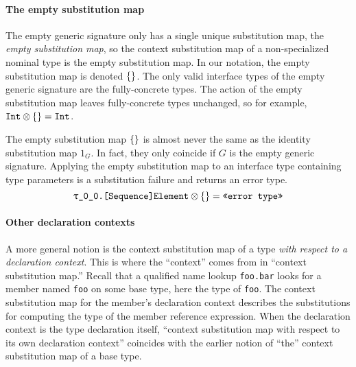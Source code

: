 \documentclass[../generics]{subfiles}
\begin{document}
\paragraph{The empty substitution map}
The empty generic signature only has a single unique substitution map, the \emph{empty substitution map}, so the context substitution map of a non-specialized nominal type is the empty substitution map. In our notation, the empty substitution map is denoted $\{\}$. The only valid interface types of the empty generic signature are the fully-concrete types. The action of the empty substitution map leaves fully-concrete types unchanged, so for example, $\texttt{Int}\otimes\{\} = \texttt{Int}$.

The empty substitution map $\{\}$ is almost never the same as the identity substitution map $1_G$. In fact, they only coincide if $G$ is the empty generic signature. Applying the empty substitution map to an interface type containing type parameters is a substitution failure and returns an error type.
\[\texttt{\texttt{$\uptau$\_0\_0}.[Sequence]Element} \otimes \{\} = \texttt{<<error type>>}\]

\paragraph{Other declaration contexts} A more general notion is the context substitution map of a type \emph{with respect to a declaration context}. This is where the ``context'' comes from in ``context substitution map.'' Recall that a qualified name lookup \texttt{foo.bar} looks for a member named \texttt{foo} on some base type, here the type of \texttt{foo}. The context substitution map for the member's declaration context describes the substitutions for computing the type of the member reference expression. When the declaration context is the type declaration itself, ``context substitution map with respect to its own declaration context'' coincides with the earlier notion of ``the'' context substitution map of a base type.
\end{document}
